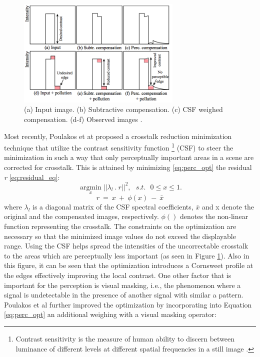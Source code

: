 \begin{figure}
\centering
    \includegraphics[width=0.7\textwidth]{./Template_Figures/perceptual_ct}
    \caption{(a) Input image. (b) Subtractive compensation. (c) CSF weighed compensation. (d-f) Observed images \cite{van2011perceptually}.\label{fig:perc_opt}}
\end{figure}
 Most recently, Poulakos et at \cite{van2011perceptually} proposed a crosstalk reduction minimization technique that utilize the contrast sensitivity function \footnote{Contrast sensitivity is the measure of human ability to discern between luminance of different levels at different spatial frequencies in a still image \cite{ wiki:CSF}. } (CSF) to steer the minimization in such a way that only perceptually important areas in a scene are corrected for crosstalk. This is attained by minimizing \ref{eq:perc_opt} the residual \emph{r} \ref{eq:residual_eq}:
 \begin{equation}
\underset{x}{\operatorname{argmin}}||\lambda_l \: . \: r||^2, \:\:\: s.t. \:\:\: 0 \leq x \leq 1.
\label{eq:perc_opt}
\end{equation}
\begin{equation}
r\: = \: x\: + \: \phi(x)\: - \: \bar{x}
\label{eq:residual_eq}
\end{equation}
where $\lambda_l$ is a diagonal matrix of the CSF spectral coefficients, $\bar{x}$ and x denote the original and the compensated images, respectively. $\phi()$ denotes the non-linear function representing the crosstalk. The constraints on the optimization are necessary so that the minimized image values do not exceed the displayable range. Using the CSF helps spread the intensities of the uncorrectable crosstalk to the areas which are perceptually less important (as seen in Figure \ref{fig:perc_opt}). Also in this figure, it can be seen that the optimization introduces a Cornsweet profile at the edges effectively improving the local contrast. One other factor that is important for the perception is visual masking, i.e., the phenomenon where a signal is undetectable in the presence of another signal with similar a pattern. Poulakos et al further improved the optimization by incorporating into Equation \ref{eq:perc_opt} an additional weighing with a visual masking operator:
